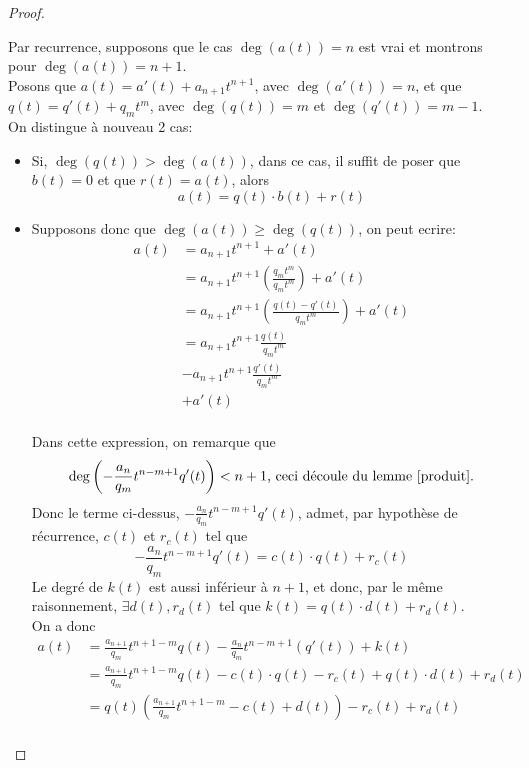 \documentclass[11pt, a4paper, twoside]{article}
\begin{document}
\begin{proof}
\begin{itemize}
\end{itemize}
Par recurrence, supposons que le cas $\deg(a(t))=n$ est vrai et montrons pour $\deg(a(t))=n+1$.\\
Posons que $a(t)=a'(t) + a_{n+1} t^{n+1}$, avec $\deg(a'(t))=n$, et que $q(t) = q'(t) + q_m t^{m}$, avec $\deg(q(t)) = m$ et $\deg(q'(t))= m-1$.\\
On distingue à nouveau 2 cas:
\begin{itemize}
	\item Si, $\deg(q(t)) > \deg(a(t))$, dans ce cas, il suffit de poser que $b(t) = 0$ et que $r(t)= a(t)$, alors
		\[ 
			a(t) = q(t) \cdot b(t) + r(t)
		\]
	\item Supposons donc que $\deg(a(t)) \geq \deg(q(t))$, on peut ecrire:
		\begin{align*}
			a(t) &= a_{n+1} t^{n+1} + a'(t)\\
			     &= a_{n+1} t^{n+1} \left( \frac{q_m t^{m}}{q_{m} t^{m}}\right) + a'(t)\\
			     &= a_{n+1} t^{n+1} \left( \frac{q(t) - q'(t)}{q_{m} t^{m}}\right) + a'(t)\\
			     &= a_{n+1} t^{n+1} \frac{q(t)}{q_m t^{m}}\\
			     &- a_{n+1} t^{n+1} \frac{q'(t)}{q_m t^{m}}\\
			     &+ a'(t)\\
		\end{align*}
		
Dans cette expression, on remarque que
\[ 
	\deg\left(-\frac{a_n}{q_m} t^{n-m+1} q'(t)\right) < n+1 \text{, ceci découle du lemme \ref{produit}.}
\]
Donc le terme ci-dessus, $-\frac{a_n}{q_m} t^{n-m+1} q'(t)$, admet, par hypothèse de récurrence, $c(t)$ et $r_c(t)$ tel que
\[ 
	-\frac{a_n}{q_m} t^{n-m+1} q'(t) = c(t) \cdot q(t) + r_c(t)
\]
Le degré de $k(t)$ est aussi inférieur à $n+1$, et donc, par le même raisonnement, $\exists d(t) , r_d(t)$ tel que $k(t)= q(t)\cdot d(t) + r_d(t)$.\\
On a donc
\begin{align*}
	a(t) &= \frac{a_{n+1}}{q_m} t^{n+1-m} q(t) - \frac{a_n}{q_m} t^{n-m+1} ( q'(t)) + k(t)\\
	     &= \frac{a_{n+1}}{q_m} t^{n+1-m} q(t) - c(t) \cdot q(t) - r_c(t) + q(t) \cdot d(t) + r_d(t)\\
	     &= q(t) \left( \frac{a_{n+1}}{q_m} t^{n+1-m} - c(t) + d(t) \right) - r_c(t) + r_d(t) \\
\end{align*}

\end{itemize}
\end{proof}
\end{document}
